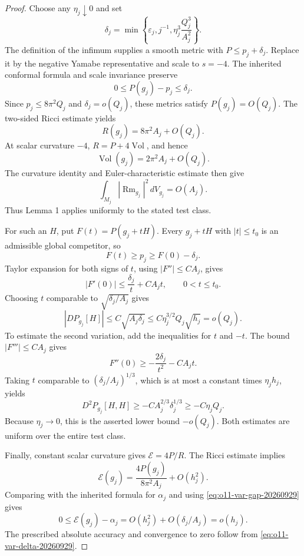 \begin{proof}
Choose any $\eta_j\downarrow0$ and set
\begin{equation}
 \delta_j=\min\left\{
       \varepsilon_j,j^{-1},\eta_j^3\frac{Q_j^3}{A_j^2}
                    \right\}.
 \label{eq:o11-var-delta-20260929}
\end{equation}
The definition of the infimum supplies a smooth metric with $P\le
p_j+\delta_j$. Replace it by the negative Yamabe representative and
scale to $s=-4$. The inherited conformal formula and scale invariance
preserve
\begin{equation}
             0\le P(g_j)-p_j\le\delta_j.
 \label{eq:o11-var-gap-20260929}
\end{equation}
Since $p_j\le8\pi^2Q_j$ and $\delta_j=o(Q_j)$, these metrics satisfy
$P(g_j)=O(Q_j)$. The two-sided Ricci estimate yields
\[
 R(g_j)=8\pi^2A_j+O(Q_j).
\]
At scalar curvature $-4$, $R=P+4\operatorname{Vol}$, and hence
\[
 \operatorname{Vol}(g_j)=2\pi^2A_j+O(Q_j).
\]
The curvature identity and Euler-characteristic estimate then give
\[
 \int_{M_j}|\operatorname{Rm}_{g_j}|^2\,dV_{g_j}=O(A_j).
\]
Thus Lemma 1 applies uniformly to the stated test class.

For such an $H$, put $F(t)=P(g_j+tH)$. Every $g_j+tH$ with
$|t|\le t_0$ is an admissible global competitor, so
\[
                  F(t)\ge p_j\ge F(0)-\delta_j.
\]
Taylor expansion for both signs of $t$, using $|F''|\le CA_j$, gives
\[
 |F'(0)|\le\frac{\delta_j}{t}+CA_jt,
 \qquad 0<t\le t_0.
\]
Choosing $t$ comparable to $\sqrt{\delta_j/A_j}$ gives
\begin{equation}
 |DP_{g_j}[H]|\le C\sqrt{A_j\delta_j}
       \le C\eta_j^{3/2}Q_j\sqrt{h_j}=o(Q_j).
 \label{eq:o11-var-first-20260929}
\end{equation}
To estimate the second variation, add the inequalities for $t$ and $-t$.
The bound $|F'''|\le CA_j$ gives
\[
 F''(0)\ge-\frac{2\delta_j}{t^2}-CA_jt.
\]
Taking $t$ comparable to $(\delta_j/A_j)^{1/3}$, which is at most a
constant times $\eta_jh_j$, yields
\begin{equation}
 D^2P_{g_j}[H,H]\ge-CA_j^{2/3}\delta_j^{1/3}
                        \ge-C\eta_jQ_j.
 \label{eq:o11-var-second-20260929}
\end{equation}
Because $\eta_j\to0$, this is the asserted lower bound $-o(Q_j)$.
Both estimates are uniform over the entire test class.

Finally, constant scalar curvature gives $\mathcal E=4P/R$. The Ricci
estimate implies
\[
 \mathcal E(g_j)=\frac{4P(g_j)}{8\pi^2A_j}+O(h_j^2).
\]
Comparing with the inherited formula for $\alpha_j$ and using
\eqref{eq:o11-var-gap-20260929} gives
\[
 0\le\mathcal E(g_j)-\alpha_j
       =O(h_j^2)+O(\delta_j/A_j)=o(h_j).
\]
The prescribed absolute accuracy and convergence to zero follow from
\eqref{eq:o11-var-delta-20260929}.
\end{proof}

